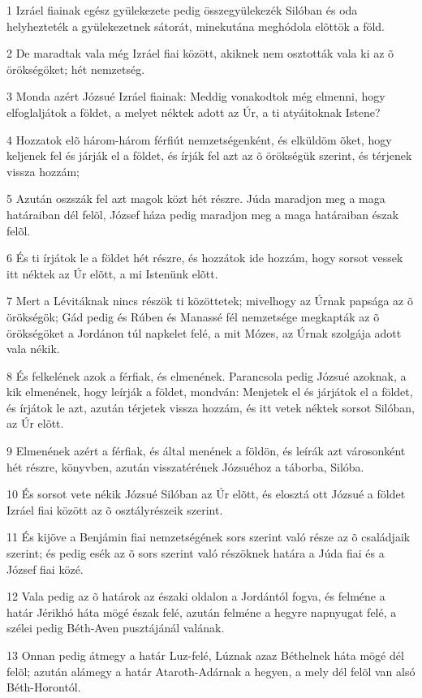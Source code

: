 \par 1 Izráel fiainak egész gyülekezete pedig összegyülekezék Silóban és oda helyhezteték a gyülekezetnek sátorát, minekutána meghódola elõttök a föld.
\par 2 De maradtak vala még Izráel fiai között, akiknek nem osztották vala ki az õ örökségöket; hét nemzetség.
\par 3 Monda azért Józsué Izráel fiainak: Meddig vonakodtok még elmenni, hogy elfoglaljátok a földet, a melyet néktek adott az Úr, a ti atyáitoknak Istene?
\par 4 Hozzatok elõ három-három férfiút nemzetségenként, és elküldöm õket, hogy keljenek fel és járják el a földet, és írják fel azt az õ örökségük szerint, és térjenek vissza hozzám;
\par 5 Azután oszszák fel azt magok közt hét részre. Júda maradjon meg a maga határaiban dél felõl, József háza pedig maradjon meg a maga határaiban észak felõl.
\par 6 És ti írjátok le a földet hét részre, és hozzátok ide hozzám, hogy sorsot vessek itt néktek az Úr elõtt, a mi Istenünk elõtt.
\par 7 Mert a Lévitáknak nincs részök ti közöttetek; mivelhogy az Úrnak papsága az õ örökségök;  Gád pedig és Rúben és Manassé fél nemzetsége megkapták az õ örökségöket a Jordánon túl napkelet felé, a mit Mózes, az Úrnak szolgája adott vala nékik.
\par 8 És felkelének azok a férfiak, és elmenének. Parancsola pedig Józsué azoknak, a kik elmenének, hogy leírják a földet, mondván: Menjetek el és járjátok el a földet, és írjátok le azt, azután térjetek vissza hozzám, és itt vetek néktek sorsot Silóban, az Úr elõtt.
\par 9 Elmenének azért a férfiak, és által menének a földön, és leírák azt városonként hét részre, könyvben, azután visszatérének Józsuéhoz a táborba, Silóba.
\par 10 És sorsot vete nékik Józsué Silóban az Úr elõtt, és elosztá ott Józsué a földet Izráel fiai között az õ osztályrészeik szerint.
\par 11 És kijöve a Benjámin fiai nemzetségének sors szerint való része az õ családjaik szerint; és pedig esék az õ sors szerint való részöknek határa a Júda fiai és a József fiai közé.
\par 12 Vala pedig az õ határok az északi oldalon a Jordántól fogva, és felméne a határ Jérikhó háta mögé észak felé, azután felméne a hegyre napnyugat felé, a szélei pedig Béth-Aven pusztájánál valának.
\par 13 Onnan pedig átmegy a határ Luz-felé, Lúznak azaz Béthelnek háta mögé dél felõl; azután alámegy a határ Ataroth-Adárnak a hegyen, a mely dél felõl van alsó Béth-Horontól.
